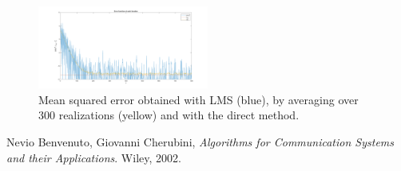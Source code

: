 \documentclass[a4paper, 12pt]{report}
\begin{document}
\begin{figure}[H]
	\centering
	\includegraphics[width=0.5\textwidth]{error_300real}
	\caption{Mean squared error obtained with LMS (blue), by averaging over 300 realizations (yellow) and with the direct method.}
	\label{fig:err300}
\end{figure}

\begin{thebibliography}{15}
	Nevio Benvenuto, Giovanni Cherubini,
	\textit{Algorithms for Communication Systems and their Applications}. 
	Wiley, 2002.
\end{thebibliography}
\end{document}
